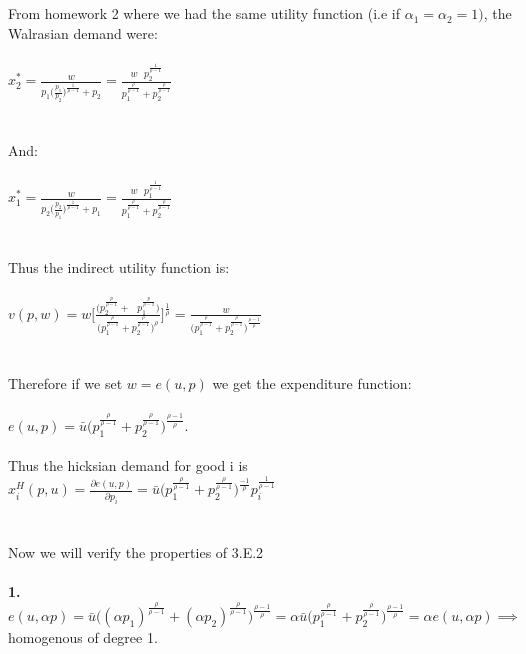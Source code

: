 \documentclass[12pt]{article}
\newenvironment{problem}[2][Problem]{\begin{trivlist}
\item[\hskip \labelsep {\bfseries #1}\hskip \labelsep {\bfseries #2.}]}{\end{trivlist}}
\newcommand\ddfrac[2]{\frac{\displaystyle #1}{\displaystyle #2}}
\begin{document}
\begin{problem}{4}. \\ \\
From homework 2 where we had the same utility function (i.e if $ \alpha_1 = \alpha_2 =1) $, the Walrasian demand were:
\\
\\
$ x_2^* = \ddfrac{w}{p_1  \bigg(\ddfrac{p_1}{ p_2}\bigg)^{\frac{1}{\rho-1}} + p_2} = \ddfrac{w \text{ }p_2^{\frac{1}{\rho-1}}}{p_1^{\frac{\rho}{\rho-1}} + p_2^{\frac{\rho}{\rho-1}}}$
\\
\\
\\And:
\\
\\
$x_1^* = \ddfrac{w}{p_2  \bigg(\ddfrac{p_2}{ p_1}\bigg)^{\frac{1}{\rho-1}} + p_1} = \ddfrac{w \text{ }p_1^{\frac{1}{\rho-1}}}{p_1^{\frac{\rho}{\rho-1}} + p_2^{\frac{\rho}{\rho-1}}}$
\\
\\
\\
Thus the indirect utility function is:
\\
\\
$v(p,w) = w \Bigg[ \ddfrac{\bigg(p_2^{\frac{p}{\rho-1}} + \text{ }p_1^{\frac{p}{\rho-1}}\bigg)}{\bigg(p_1^{\frac{\rho}{\rho-1}} + p_2^{\frac{\rho}{\rho-1}}\bigg)^\rho} \Bigg]^{\frac{1}{\rho}} = \ddfrac{w}{\bigg(p_1^{\frac{\rho}{\rho-1}} + p_2^{\frac{\rho}{\rho-1}}\bigg)^\frac{\rho - 1}{\rho}}  $
\\
\\
\\
Therefore if we set $w = e(u, p) $ we get the expenditure function: 
\\
\\
$ e(u, p)= \bar{u} \bigg(p_1^{\frac{\rho}{\rho-1}} + p_2^{\frac{\rho}{\rho-1}}\bigg)^\frac{\rho - 1}{\rho}$. 
\\
\\
Thus the hicksian demand for good i is $ x_i^H(p, u) = \ddfrac{\partial e(u, p)}{\partial p_i} = \bar{u} \bigg(p_1^{\frac{\rho}{\rho-1}} + p_2^{\frac{\rho}{\rho-1}}\bigg)^\frac{ - 1}{\rho} p_i^\frac{ 1}{\rho-1}$
\\
\\
\\
Now we will verify the properties of 3.E.2
\\
\\
\textbf{1.} $e(u, \alpha p)= \bar{u} \bigg((\alpha p_1)^{\frac{\rho}{\rho-1}} + (\alpha p_2)^{\frac{\rho}{\rho-1}}\bigg)^\frac{\rho - 1}{\rho} = \alpha \bar{u} \bigg(p_1^{\frac{\rho}{\rho-1}} + p_2^{\frac{\rho}{\rho-1}}\bigg)^\frac{\rho - 1}{\rho} = \alpha e(u, \alpha p) \implies $ homogenous of degree 1. 

\end{problem}
\end{document}
